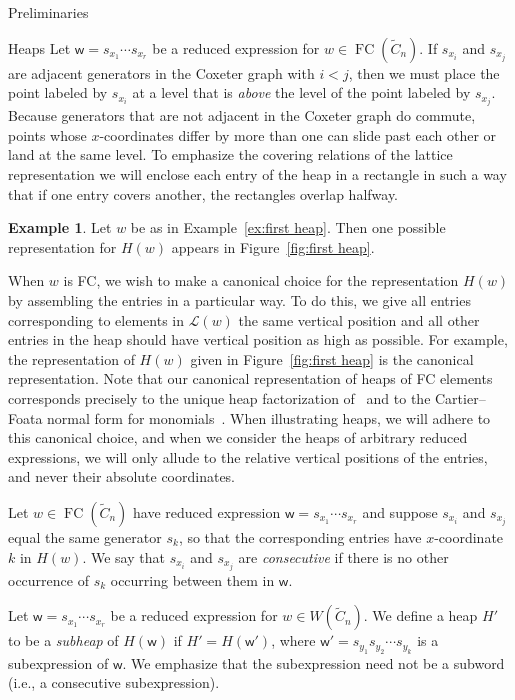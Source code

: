 \documentclass[11pt]{amsart}
\theoremstyle{definition}
\newtheorem{example}[theorem]{Example}
\numberwithin{equation}{section}
\newcommand{\C}{\widetilde{C}}
\renewcommand{\L}{\mathcal{L}}
\renewcommand{\(}{\left(}
\renewcommand{\)}{\right)}
\newcommand{\w}{\mathsf{w}}
\DeclareMathOperator{\FC}{FC}
\begin{document}
\begin{section}{Preliminaries}
\begin{subsection}{Heaps}
Let $\w=s_{x_1}\cdots s_{x_r}$ be a reduced expression for $w \in \FC(\C_{n})$.  If $s_{x_i}$ and $s_{x_j}$ are adjacent generators in the Coxeter graph with $i<j$, then we must place the point labeled by $s_{x_i}$ at a level that is \emph{above} the level of the point labeled by $s_{x_j}$.  Because generators that are not adjacent in the Coxeter graph do commute, points whose $x$-coordinates differ by more than one can slide past each other or land at the same level.  To emphasize the covering relations of the lattice representation we will enclose each entry of the heap in a rectangle in such a way that if one entry covers another, the rectangles overlap halfway.

\begin{example}\label{ex:second heap}
Let $w$ be as in Example~\ref{ex:first heap}.  Then one possible representation for $H(w)$ appears in Figure~\ref{fig:first heap}.
\end{example}

When $w$ is FC, we wish to make a canonical choice for the representation $H(w)$ by assembling the entries in a particular way.  To do this, we give all entries corresponding to elements in $\L(w)$ the same vertical position and all other entries in the heap should have vertical position as high as possible.  For example, the representation of $H(w)$ given in Figure~\ref{fig:first heap} is the canonical representation.  Note that our canonical representation of heaps of FC elements corresponds precisely to the unique heap factorization of~\cite[Lemma 2.9]{Viennot1986} and to the Cartier--Foata normal form for monomials~\cite{Cartier1969,Green2006a}.  When illustrating heaps, we will adhere to this canonical choice, and when we consider the heaps of arbitrary reduced expressions, we will only allude to the relative vertical positions of the entries, and never their absolute coordinates.  

Let $w \in \FC(\C_n)$ have reduced expression $\w=s_{x_1}\cdots s_{x_r}$ and suppose $s_{x_i}$ and $s_{x_j}$ equal the same generator $s_k$, so that the corresponding entries have $x$-coordinate $k$ in $H(w)$.  We say that $s_{x_i}$ and $s_{x_j}$ are \emph{consecutive} if there is no other occurrence of $s_{k}$ occurring between them in $\w$.

Let $\w=s_{x_{1}} \cdots s_{x_{r}}$ be a reduced expression for $w \in W(\C_{n})$.  We define a heap $H'$ to be a \emph{subheap} of $H(\w)$ if $H'=H(\w')$, where $\w'=s_{y_1}s_{y_2} \cdots s_{y_k}$ is a subexpression of $\w$.  We emphasize that the subexpression need not be a subword (i.e., a consecutive subexpression).


\end{subsection}
\end{section}
\end{document}
